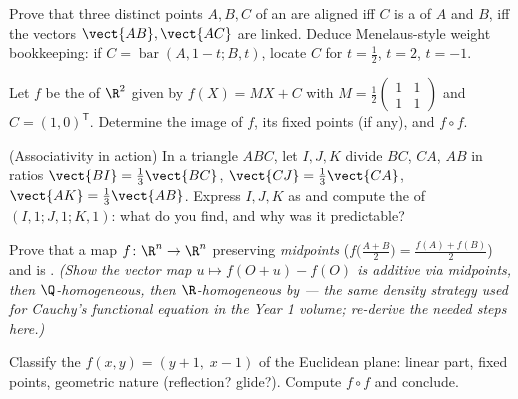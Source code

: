 \begin{exercise}[$\star$]\label{exo:b2:affine:2}
Prove that three distinct points $A, B, C$ of an  are
aligned iff $C$ is a  of $A$ and $B$, iff the vectors
$\vect{AB}, \vect{AC}$ are linked. Deduce Menelaus-style weight
bookkeeping: if $C = \operatorname{bar}(A, 1 - t; B, t)$, locate
$C$ for $t = \frac12$, $t = 2$, $t = -1$.
\end{exercise}

\begin{exercise}[$\star$]\label{exo:b2:affine:3}
Let $f$ be the  of $\R^2$ given by $f(X) = MX + C$ with
$M = \frac12\begin{pmatrix} 1 & 1\\ 1 & 1\end{pmatrix}$ and $C =
(1, 0)^{\mathsf T}$. Determine the image of $f$, its fixed points
(if any), and $f \circ f$.
\end{exercise}

\begin{exercise}[$\star\star$]\label{exo:b2:affine:4}
(Associativity in action) In a triangle $ABC$, let $I, J, K$ divide
$BC$, $CA$, $AB$ in ratios $\vect{BI} = \frac13\vect{BC}$,
$\vect{CJ} = \frac13\vect{CA}$, $\vect{AK} = \frac13\vect{AB}$.
Express $I, J, K$ as  and compute the  of
$(I,1;J,1;K,1)$: what do you find, and why was it predictable?
\end{exercise}

\begin{exercise}[$\star\star$]\label{exo:b2:affine:5}
Prove that a map $f \colon \R^n \to \R^n$ preserving \emph{midpoints}
($f\bigl(\frac{A+B}{2}\bigr) = \frac{f(A) + f(B)}{2}$) and
\emph{} is . \emph{(Show the vector map $u \mapsto
f(O + u) - f(O)$ is additive via midpoints, then
$\Q$-homogeneous, then $\R$-homogeneous by  ---
the same density strategy used for Cauchy's functional equation in
the Year 1 volume; re-derive the needed steps here.)}
\end{exercise}

\begin{exercise}[$\star\star$]\label{exo:b2:affine:6}
Classify the  $f(x, y) = (y + 1,\; x - 1)$ of the
Euclidean plane: linear part, fixed points, geometric nature
(reflection? glide?). Compute $f \circ f$ and conclude.
\end{exercise}

